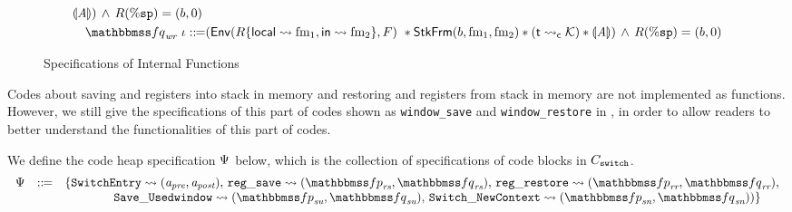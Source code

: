 \begin{figure}[!t]
\[\begin{array}{l}
            \safePrimAst{\primcom}) \, \land \, \RFile(\spreg) = (\block, 0) \\
            \\[-9pt]
            \quad
            \relspecpost_{\textit{wr}} \ \lgvl \define 
            (\Env{\RFile\{ \localRN \rightsquigarrow \fm_1, \inRN \rightsquigarrow \fm_2 \}, \Wstack} \
            \sepstar \RelStkFm{\block}{\fm_1}{\fm_2} 
            \sepstar (\astCurCont{\thrdid}{\hthrdlocalst}) \sepstar 
            \safePrimAst{\primcom}) 
            \, \land \, \RFile(\spreg) = (\block, 0) 
        \end{array}
    \]
    \caption{Specifications of Internal Functions}
    \label{fig:Specifications of Internal Functions}
\end{figure}

Codes about saving \localRN{} and \inRN{} registers 
into stack in memory and restoring \localRN{} and 
\inRN{} registers from stack in memory are not 
implemented as functions. However, we still give 
the specifications of this part of codes shown 
as \texttt{window\_save} and \texttt{window\_restore}
in \Fig{\ref{fig:Specifications of Internal Functions}}, 
in order to allow readers to better understand 
the functionalities of this part of codes. 

We define the code heap specification $\Psi{}$ 
below, which is the collection of specifications of 
code blocks in $C_{\texttt{switch}}$.
\begin{equation}
    \begin{array}{lcl}
        \Cspec & \define & 
        \{
            \texttt{SwitchEntry} \leadsto (\Apre, \Apost), \,
            \texttt{reg}\_\texttt{save} \leadsto 
            (\relspecpre_{\textit{rs}}, \relspecpost_{\textit{rs}}), \,
            \texttt{reg}\_\texttt{restore} \leadsto
            (\relspecpre_{\textit{rr}}, \relspecpost_{\textit{rr}}), \\
            & & \qquad\qquad
            \SaveUsedWin{} \leadsto (\relspecpre_{\textit{su}}, \relspecpost_{\textit{su}}), \,
            \SwitchNewTask{} \leadsto (\relspecpre_{\textit{sn}}, \relspecpost_{\textit{sn}})) 
        \}
    \end{array}
    \label{a:ctxswitch-Cspec}
\end{equation}

